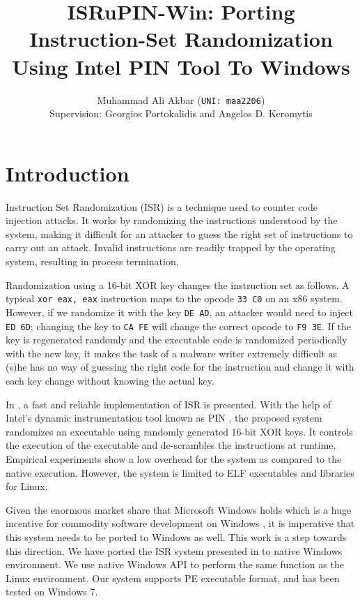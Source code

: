 \documentclass[a4paper,12pt]{llncs}
\title{ISRuPIN-Win: Porting Instruction-Set Randomization Using Intel PIN Tool To Windows}
\author{Muhammad Ali Akbar (\texttt{UNI: maa2206})\\Supervision: Georgios Portokalidis and Angelos D. Keromytis\\
\email{maa2206@columbia.edu}
\institute{Computer Science Department,\\ Fu Foundation School of Engineering \& Applied Sciences,\\ Columbia University, NY}}
\begin{document}
\maketitle
\pagebreak

\section{Introduction}
\label{sec:intro}
Instruction Set Randomization (ISR) is a technique used to counter code injection attacks. It works by randomizing the instructions understood by the system, making it difficult for an attacker to guess the right set of instructions to carry out an attack. Invalid instructions are readily trapped by the operating system, resulting in process termination.

Randomization using a 16-bit XOR key changes the instruction set as follows. A typical \texttt{xor eax, eax} instruction maps to the opcode \texttt{33 C0} on an x86 system. However, if we randomize it with the key \texttt{DE AD}, an attacker would need to inject \texttt {ED 6D}; changing the key to \texttt{CA FE} will change the correct opcode to \texttt{F9 3E}. If the key is regenerated randomly and the executable code is randomized periodically with the new key, it makes the task of a malware writer extremely difficult as (s)he has no way of guessing the right code for the instruction and change it with each key change without knowing the actual key.

In \cite{portokalidis2010fast}, a fast and reliable implementation of ISR is presented. With the help of Intel's dynamic instrumentation tool known as PIN \cite{luk2005pin}, the proposed system randomizes an executable using randomly generated 16-bit XOR keys. It controls the execution of the executable and de-scrambles the instructions at runtime. Empirical experiments show a low overhead for the system as compared to the native execution. However, the system is limited to ELF executables and libraries for Linux.

Given the enormous market share that Microsoft Windows holds which is a huge incentive for commodity software development on Windows \cite{economides2006linux}, it is imperative that this system needs to be ported to Windows as well. This work is a step towards this direction. We have ported the ISR system presented in \cite{portokalidis2010fast} to native Windows environment. We use native Windows API to perform the same function as the Linux environment. Our system supports PE executable format, and has been tested on Windows 7.
\end{document}
